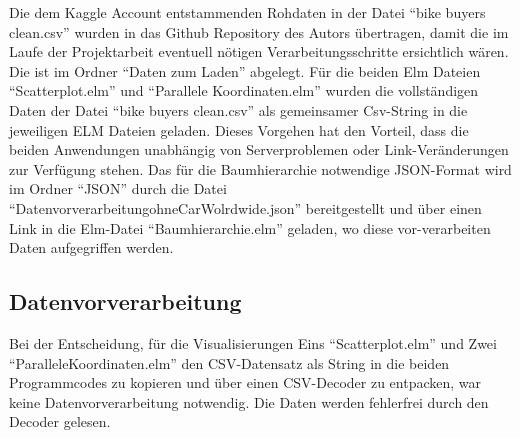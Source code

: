 \documentclass[usegeometry=true]{scrartcl}
\begin{document}
Die dem Kaggle Account \cite{Dedhia.22.09.2020} entstammenden Rohdaten in der Datei "`bike buyers clean.csv"' wurden in das Github Repository des Autors übertragen, damit die im Laufe der Projektarbeit eventuell nötigen Verarbeitungsschritte ersichtlich wären. Die ist im Ordner "`Daten zum Laden"' abgelegt. Für die beiden Elm Dateien "`Scatterplot.elm"' und "`Parallele Koordinaten.elm"' wurden die vollständigen Daten der Datei "`bike buyers clean.csv"' als gemeinsamer Csv-String in die jeweiligen ELM Dateien geladen. Dieses Vorgehen hat den Vorteil, dass die beiden Anwendungen unabhängig von Serverproblemen oder Link-Veränderungen zur Verfügung stehen. Das für die Baumhierarchie notwendige JSON-Format wird im Ordner "`JSON"' durch die Datei "`DatenvorverarbeitungohneCarWolrdwide.json"' bereitgestellt und über einen Link in die  Elm-Datei "`Baumhierarchie.elm"' geladen, wo diese vor-verarbeiten Daten aufgegriffen werden. 


\subsection{Datenvorverarbeitung}
Bei der Entscheidung, für die Visualisierungen Eins "`Scatterplot.elm"' und Zwei "`ParalleleKoordinaten.elm"' den CSV-Datensatz als String in die beiden Programmcodes zu kopieren und über einen CSV-Decoder zu entpacken, war keine Datenvorverarbeitung notwendig. Die Daten werden fehlerfrei durch den Decoder gelesen.
\end{document}
